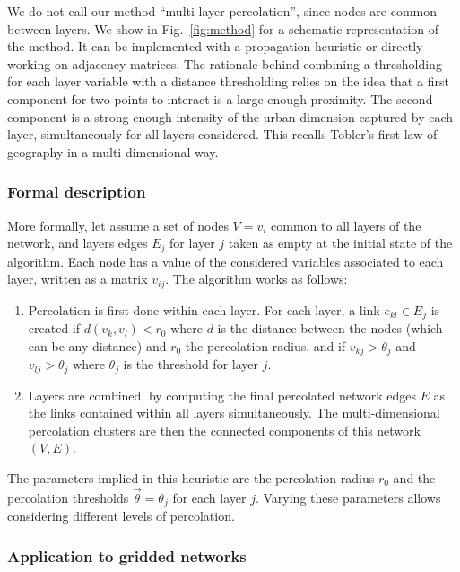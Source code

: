 \documentclass{jimis-en}
\begin{document}
We do not call our method ``multi-layer percolation'', since nodes are common between layers. We show in Fig.~\ref{fig:method} for a schematic representation of the method. It can be implemented with a propagation heuristic or directly working on adjacency matrices. The rationale behind combining a thresholding for each layer variable with a distance thresholding relies on the idea that a first component for two points to interact is a large enough proximity. The second component is a strong enough intensity of the urban dimension captured by each layer, simultaneously for all layers considered. This recalls Tobler's first law of geography \citep{tobler2004first} in a multi-dimensional way.


\subsubsection{Formal description}

More formally, let assume a set of nodes $V = v_i$ common to all layers of the network, and layers edges $E_j$ for layer $j$ taken as empty at the initial state of the algorithm. Each node has a value of the considered variables associated to each layer, written as a matrix $v_{ij}$. The algorithm works as follows:
\begin{enumerate}
	\item Percolation is first done within each layer. For each layer, a link $e_{kl} \in E_j$ is created if $d(v_k,v_l) < r_0$ where $d$ is the distance between the nodes (which can be any distance) and $r_0$ the percolation radius, and if $v_{kj} > \theta_j$ and $v_{lj} > \theta_j$ where $\theta_j$ is the threshold for layer $j$.
	\item Layers are combined, by computing the final percolated network edges $E$ as the links contained within all layers simultaneously. The multi-dimensional percolation clusters are then the connected components of this network $(V,E)$.
\end{enumerate}

 
The parameters implied in this heuristic are the percolation radius $r_0$ and the percolation thresholds $\vec{\theta} = \theta_j$ for each layer $j$. Varying these parameters allows considering different levels of percolation.



\subsubsection{Application to gridded networks}
\end{document}
